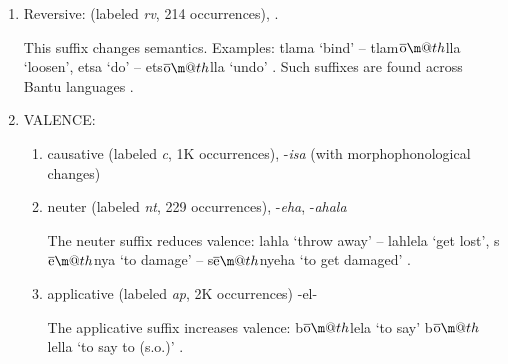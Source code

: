 \documentclass[11pt,letterpaper]{article}
\makeatletter
\newcommand*{\textoverline}[1]{$\overline{\hbox{#1}}\m@th$}
\makeatother
\begin{document}
\begin{enumerate}
\item Reversive: (labeled \textit{rv}, 214 occurrences),  \cite[]{doke1967textbook}.
    
    This suffix changes semantics.
    Examples: tlama `bind' -- tlam\textoverline{o}lla `loosen', etsa `do' -- ets\textoverline{o}lla `undo' \citep[]{doke1967textbook}.
    Such suffixes are found across Bantu languages \cite{schadeberg2003derivation}.




    \item VALENCE:
    \begin{enumerate}
    \item causative (labeled \textit{c}, 1K occurrences), -\textit{isa} (with morphophonological changes) \cite[]{doke1967textbook}
    

    
    \item neuter (labeled \textit{nt}, 229 occurrences), -\textit{eha}, -\textit{ahala} \cite[]{doke1967textbook}
    
    The neuter suffix reduces valence: lahla `throw away' -- lahlela `get lost', s\textoverline{e}nya `to damage' -- s\textoverline{e}nyeha `to get damaged' \citep[]{doke1967textbook}.

    
    
    \item applicative
    (labeled \textit{ap}, 2K occurrences) -el- \cite[]{doke1967textbook}
    
    The applicative suffix increases valence: b\textoverline{o}lela `to say' b\textoverline{o}lella `to say to (s.o.)' \citep[]{doke1967textbook}.
    
    
    
    
    
    

\end{enumerate}
\end{enumerate}
\end{document}
